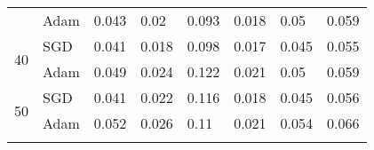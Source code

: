 \documentclass{article}
\begin{document}
\begin{table}
\begin{tabular}{cl|llllll}
                           & Adam                                    & 0.043                                     & 0.02                                      & 0.093                                     & 0.018                                     & 0.05                                      & 0.059                                      \\
\multirow{2}{*}{40}        & {\cellcolor[rgb]{0.788,0.788,0.788}}SGD & {\cellcolor[rgb]{0.788,0.788,0.788}}0.041 & {\cellcolor[rgb]{0.788,0.788,0.788}}0.018 & {\cellcolor[rgb]{0.788,0.788,0.788}}0.098 & {\cellcolor[rgb]{0.788,0.788,0.788}}0.017 & {\cellcolor[rgb]{0.788,0.788,0.788}}0.045 & {\cellcolor[rgb]{0.788,0.788,0.788}}0.055  \\
                           & Adam                                    & 0.049                                     & 0.024                                     & 0.122                                     & 0.021                                     & 0.05                                      & 0.059                                      \\
\multirow{2}{*}{50}        & {\cellcolor[rgb]{0.788,0.788,0.788}}SGD & {\cellcolor[rgb]{0.788,0.788,0.788}}0.041 & {\cellcolor[rgb]{0.788,0.788,0.788}}0.022 & {\cellcolor[rgb]{0.788,0.788,0.788}}0.116 & {\cellcolor[rgb]{0.788,0.788,0.788}}0.018 & {\cellcolor[rgb]{0.788,0.788,0.788}}0.045 & {\cellcolor[rgb]{0.788,0.788,0.788}}0.056  \\
                           & Adam                                    & 0.052                                     & 0.026                                     & 0.11                                      & 0.021                                     & 0.054                                     & 0.066                                      \\
\bottomrule
\label{result}
\end{tabular}
\end{table}
\end{document}
